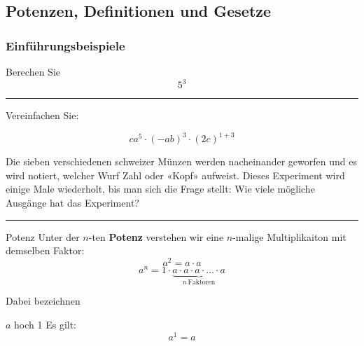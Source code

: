 \newcommand{\aaaa}{a\cdot a \cdot a \cdot{} ... \cdot a}
\newcommand{\bbbb}{b\cdot b \cdot b \cdot{} ... \cdot b}

\newpage
\subsection{Potenzen, Definitionen und Gesetze}

\subsubsection{Einführungsbeispiele}

Berechen Sie
$$5^3$$


\hrule

Vereinfachen Sie:

$$ca^5\cdot(-ab)^3\cdot{}(2c)^{1+3}$$




Die sieben verschiedenen schweizer Münzen werden nacheinander geworfen
und es wird notiert, welcher Wurf Zahl oder «Kopf» aufweist. Dieses
Experiment wird einige Male wiederholt, bis man sich die Frage stellt:
Wie viele mögliche Ausgänge hat das Experiment?


\hrule



\begin{definition}{Potenz}{}
Unter der $n$-ten \textbf{Potenz} verstehen wir eine $n$-malige Multiplikaiton mit demselben Faktor:
$$a^2 = a\cdot a$$
$$a^n = 1\cdot{} \underbrace{\aaaa}_{n\, \text{Faktoren}}$$
\end{definition}
Dabei bezeichnen


\begin{gesetz}{$a$ hoch 1}{}
  Es gilt:
  $$a^1 = a$$
\end{gesetz}



